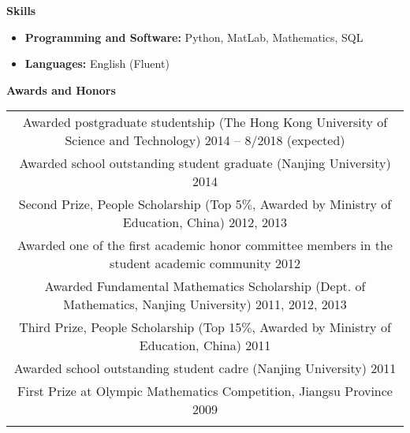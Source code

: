 \documentclass[letterpaper,10pt]{article}
\newcommand{\resheading}[1]{{\large \colorbox{mygrey}{\begin{minipage}{\textwidth}{\textbf{#1 \vphantom{p\^{E}}}}\end{minipage}}}}
\begin{document}
\resheading{Skills}
\begin{itemize}
\item \textbf{Programming and Software:} Python, MatLab, Mathematics, SQL
\item \textbf{Languages:} English (Fluent)
\end{itemize}


\resheading{Awards and Honors}
\begin{center}
\begin{tabular*}{6.5in}{l@{\extracolsep{\fill}}r}
\multicolumn{2}{c}{Awarded postgraduate studentship (The Hong Kong University of Science and Technology) \cftdotfill{\cftdotsep}2014 -- 8/2018 (expected)} \\
\multicolumn{2}{c}{Awarded school outstanding student graduate (Nanjing University) \cftdotfill{\cftdotsep}2014} \\
\multicolumn{2}{c}{Second Prize, People Scholarship (Top 5$\%$, Awarded by Ministry of Education, China) \cftdotfill{\cftdotsep}2012, 2013} \\
\multicolumn{2}{c}{Awarded one of the first academic honor committee members in the student academic community \cftdotfill{\cftdotsep} 2012} \\
\multicolumn{2}{c}{Awarded Fundamental Mathematics  Scholarship (Dept. of Mathematics, Nanjing University) \cftdotfill{\cftdotsep}2011, 2012, 2013} \\
\multicolumn{2}{c}{Third Prize, People Scholarship (Top 15$\%$, Awarded by Ministry of Education, China) \cftdotfill{\cftdotsep}2011} \\
\multicolumn{2}{c}{Awarded school outstanding student cadre (Nanjing University)\cftdotfill{\cftdotsep} 2011} \\
\multicolumn{2}{c}{First Prize at Olympic Mathematics Competition, Jiangsu Province \cftdotfill{\cftdotsep}2009} \\
\vphantom{E}
\end{tabular*}
\end{center}

\vspace{-0.2in}
\end{document}
